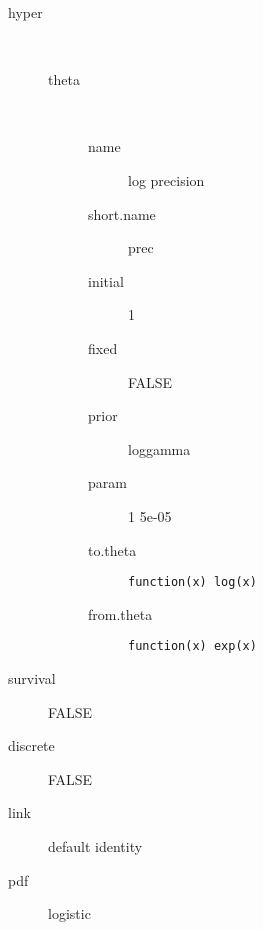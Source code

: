 \begin{description}
	\item[hyper]\ 
	 \begin{description}
	 	\item[theta]\ 
	 	 \begin{description}
	 	 	\item[name] log precision
	 	 	\item[short.name] prec
	 	 	\item[initial] 1
	 	 	\item[fixed] FALSE
	 	 	\item[prior] loggamma
	 	 	\item[param] 1 5e-05
	 	 	\item[to.theta] \verb|function(x) log(x)|
	 	 	\item[from.theta] \verb|function(x) exp(x)|
	 	 \end{description}
	 \end{description}
	\item[survival] FALSE
	\item[discrete] FALSE
	\item[link] default identity
	\item[pdf] logistic
\end{description}
